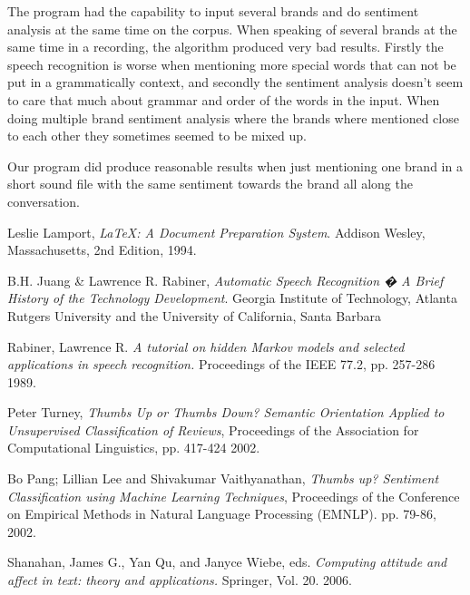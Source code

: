 \documentclass[a4paper,12pt,twoside]{ltxdoc}
\begin{document}
The program had the capability to input several brands and do sentiment analysis at the same time on the corpus. When speaking of several brands at the same time in a recording, the algorithm produced very bad results. Firstly the speech recognition is worse when mentioning more special words that can not be put in a grammatically context, and secondly the sentiment analysis doesn't seem to care that much about grammar and order of the words in the input. When doing multiple brand sentiment analysis where the brands where mentioned close to each other they sometimes seemed to be mixed up. 

Our program did produce reasonable results when just mentioning one brand in a short sound file with the same sentiment towards the brand all along the conversation. 


\newpage 

\begin{thebibliography}{9}

  Leslie Lamport,
  \emph{\LaTeX: A Document Preparation System}.
  Addison Wesley, Massachusetts,
  2nd Edition,
  1994.
  
  B.H. Juang \& Lawrence R. Rabiner,
  \emph{Automatic Speech Recognition � A Brief History of the Technology Development}.
  Georgia Institute of Technology, Atlanta
  Rutgers University and the University of California, Santa Barbara
  
Rabiner, Lawrence R.
\emph{A tutorial on hidden Markov models and selected applications in speech recognition.}
Proceedings of the IEEE 77.2,
pp. 257-286
1989.

Peter Turney, 
\emph{Thumbs Up or Thumbs Down? Semantic Orientation Applied to Unsupervised Classification of Reviews},
 Proceedings of the Association for Computational Linguistics,
 pp. 417-424
 2002.

  Bo Pang; Lillian Lee and Shivakumar Vaithyanathan,
  \emph{Thumbs up? Sentiment Classification using Machine Learning Techniques},
  Proceedings of the Conference on Empirical Methods in Natural Language Processing (EMNLP).
  pp. 79-86,
  2002.

  Shanahan, James G., Yan Qu, and Janyce Wiebe, eds.
  \emph{Computing attitude and affect in text: theory and applications.}
  Springer, 
  Vol. 20.
  2006.

\end{thebibliography}
\end{document}
